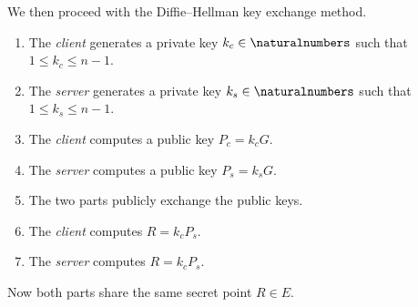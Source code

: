 \documentclass[a4paper]{article}
\begin{document}
We then proceed with the Diffie–Hellman key exchange method.
\begin{enumerate}
    \item The \textit{client} generates a private key \(k_c\in \naturalnumbers\) such that \(1\leq k_c\leq n-1\).
    \item The \textit{server} generates a private key \(k_s\in \naturalnumbers\) such that \(1\leq k_s\leq n-1\).
    \item The \textit{client} computes a public key \(P_c=k_c G\).
    \item The \textit{server} computes a public key \(P_s=k_s G\).
    \item The two parts publicly exchange the public keys.
    \item The \textit{client} computes \(R=k_c P_s\).
    \item The \textit{server} computes \(R=k_c P_s\).
\end{enumerate}

Now both parts share the same secret point \(R\in E\).
\end{document}
